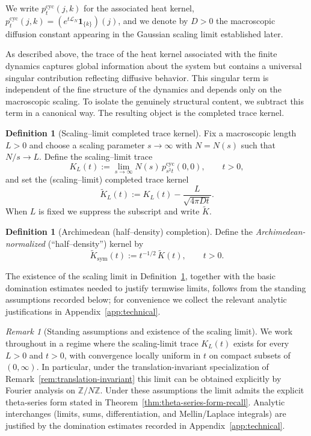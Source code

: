\documentclass[12pt]{amsart}
\theoremstyle{definition}
\newtheorem{definition}[theorem]{Definition}
\theoremstyle{remark}
\newtheorem{remark}[theorem]{Remark}
\newcommand{\Z}{\mathbb{Z}}
\begin{document}
We write $p^{\mathrm{cyc}}_t(j,k)$ for the associated heat kernel,
\(p^{\mathrm{cyc}}_t(j,k)=(e^{t\mathcal{L}_N}\mathbf{1}_{\{k\}})(j)\), and we denote by $D>0$ the macroscopic diffusion constant appearing in the Gaussian scaling limit established later.

As described above, the trace of the heat kernel associated with the finite dynamics captures global information about the system but contains a universal singular contribution reflecting diffusive behavior. This singular term is independent of the fine structure of the dynamics and depends only on the macroscopic scaling. To isolate the genuinely structural content, we subtract this term in a canonical way. The resulting object is the completed trace kernel.

\begin{definition}[Scaling--limit completed trace kernel]
\label{def:scaling-limit}
Fix a macroscopic length $L>0$ and choose a scaling parameter $s\to\infty$ with $N=N(s)$ such that $N/s\to L$.
Define the scaling--limit trace
\[
K_L(t):=\lim_{s\to\infty} N(s)\,p^{\mathrm{cyc}}_{s^2 t}(0,0),\qquad t>0,
\]
and set the (scaling--limit) completed trace kernel
\[
\widetilde K_L(t):=K_L(t)-\frac{L}{\sqrt{4\pi D t}}.
\]
When $L$ is fixed we suppress the subscript and write $\widetilde K$.
\end{definition}

\begin{definition}[Archimedean (half--density) completion]
\label{def:half-density}
Define the \emph{Archimedean-normalized} (``half--density'') kernel by
\[
\widetilde K_{\mathrm{sym}}(t):=t^{-1/2}\,\widetilde K(t),\qquad t>0.
\]
\end{definition}

The existence of the scaling limit in Definition~\ref{def:scaling-limit}, together with the basic domination estimates needed to justify termwise limits, follows from the standing assumptions recorded below; for convenience we collect the relevant analytic justifications in Appendix~\ref{app:technical}.

\begin{remark}[Standing assumptions and existence of the scaling limit]
\label{rem:standing-assumptions}
We work throughout in a regime where the scaling-limit trace $K_L(t)$ exists for every $L>0$ and $t>0$, with convergence locally uniform in $t$ on compact subsets of $(0,\infty)$. In particular, under the translation-invariant specialization of Remark~\ref{rem:translation-invariant} this limit can be obtained explicitly by Fourier analysis on $\Z/N\Z$. Under these assumptions the limit admits the explicit theta-series form stated in Theorem~\ref{thm:theta-series-form-recall}. Analytic interchanges (limits, sums, differentiation, and Mellin/Laplace integrals) are justified by the domination estimates recorded in Appendix~\ref{app:technical}.
\end{remark}
\end{document}
